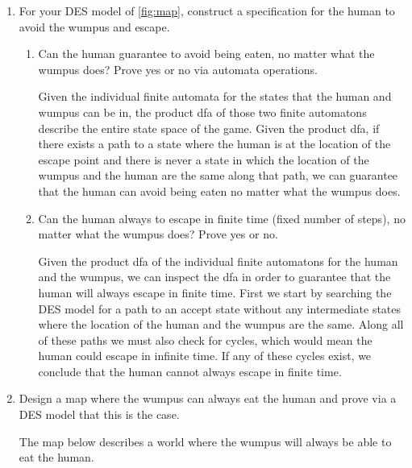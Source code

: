 \documentclass[12pt,letterpaper]{ntdhw}
\begin{document}
\begin{enumerate}
  \item For your DES model of \autoref{fig:map}, construct a specification
  for the human to avoid the wumpus and escape.
  \begin{enumerate}
    \item Can the human guarantee to avoid being eaten, no matter what
    the wumpus does?  Prove yes or no via automata operations.
    
    Given the individual finite automata for the states that the human and wumpus can be in, the product dfa of those two finite automatons describe the entire state space of the game. Given the product dfa, if there exists a path to a state where the human is at the location of the escape point and there is never a state in which the location of the wumpus and the human are the same along that path, we can guarantee that the human can avoid being eaten no matter what the wumpus does.
    \item Can the human always to escape in finite time (fixed
    number of steps), no matter what the wumpus does?  Prove yes or
    no.

    Given the product dfa of the individual finite automatons for the human and the wumpus, we can inspect the dfa in order to guarantee that the human will always escape in finite time. First we start by searching the DES model for a path to an accept state without any intermediate states where the location of the human and the wumpus are the same. Along all of these paths we must also check for cycles, which would mean the human could escape in infinite time.  If any of these cycles exist, we conclude that the human cannot always escape in finite time.
  \end{enumerate}

  \item Design a map where the wumpus can always eat the human and
  prove via a DES model that this is the case.

  The map below describes a world where the wumpus will always be able to eat the human.
  \begin{center}
  \label{fig:map3}
\end{center}


\end{enumerate}
\end{document}
